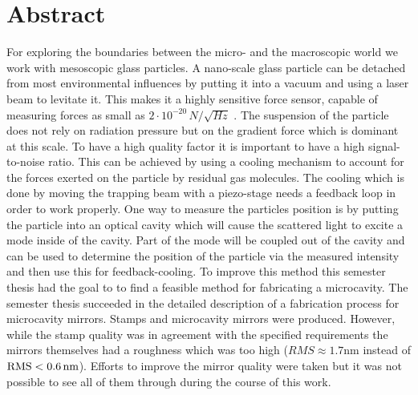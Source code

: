 \section*{Abstract}
For exploring the boundaries between the micro- and the macroscopic world we work with mesoscopic glass particles. A nano-scale glass particle can be detached from most environmental influences by putting it into a vacuum and using a laser beam to levitate it. This makes it a highly sensitive force sensor, capable of measuring forces as small as $2\cdot 10^{-20}\,\si{N/\sqrt{Hz}}$ \cite{gieseler2013thermal}. The suspension of the particle does not rely on radiation pressure but on the gradient force which is dominant at this scale. To have a high quality factor it is important to have a high signal-to-noise ratio. This can be achieved by using a cooling mechanism to account for the forces exerted on the particle by residual gas molecules. The cooling which is done by moving the trapping beam with a piezo-stage needs a feedback loop in order to work properly. One way to measure the particles position is by putting the particle into an optical cavity which will cause the scattered light to excite a mode inside of the cavity. Part of the mode will be coupled out of the cavity and can be used to determine the position of the particle via the measured intensity and then use this for feedback-cooling. To improve this method this semester thesis had the goal to to find a feasible method for fabricating a microcavity. The semester thesis succeeded in the detailed description of a fabrication process for microcavity mirrors. Stamps and microcavity mirrors were produced. However, while the stamp quality was in agreement with the specified requirements the mirrors themselves had a roughness which was too high ($\si{RMS\approx 1.7\nm}$ instead of $\si{RMS}<0.6\nm$). Efforts to improve the mirror quality were taken but it was not possible to see all of them through during the course of this work.
